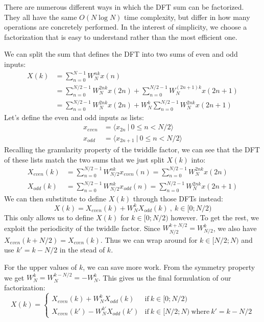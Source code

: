 There are numerous different ways in which the DFT sum can be factorized.
They all have the same $O(N \log N)$ time complexity,
but differ in how many operations are concretely performed.
In the interest of simplicity,
we choose a factorization that is easy to understand rather than the most efficient one.

We can split the sum that defines the DFT into two sums of even and odd inputs:
\begin{align}
    X(k) &= \sum_{n = 0}^{N - 1} W_N^{nk} x(n) \\
    &= \sum_{n = 0}^{N/2 - 1} W_N^{2nk} x(2n) + \sum_{n = 0}^{N/2 - 1} W_N^{(2n + 1)k} x(2n + 1) \\
    &= \sum_{n = 0}^{N/2 - 1} W_N^{2nk} x(2n) + W_N^k \sum_{n = 0}^{N/2 - 1} W_N^{2nk} x(2n + 1) %
\end{align}
Let's define the even and odd inputs as lists:
\begin{align}
    x_\textit{even} &= \langle x_{2n} ~|~ 0 \leq n < N/2 \rangle\\
    x_\textit{odd}  &= \langle x_{2n + 1} ~|~ 0 \leq n < N/2 \rangle
\end{align}
Recalling the granularity property of the twiddle factor,
we can see that the DFT of these lists match the two sums that we just split $X(k)$ into:
\begin{align}
    X_\textit{even}(k) &= \sum_{n = 0}^{N/2 - 1} W_{N/2}^{nk} x_\textit{even}(n) = \sum_{n = 0}^{N/2 - 1} W_{N}^{2nk} x(2n) \\
    X_\textit{odd}(k) &= \sum_{n = 0}^{N/2 - 1} W_{N/2}^{nk} x_\textit{odd}(n) = \sum_{n = 0}^{N/2 - 1} W_{N}^{2nk} x(2n + 1)
\end{align}
We can then substitute to define $X(k)$ through those DFTs instead:
\begin{equation}
    X(k) = X_\textit{even}(k) + W_N^k X_\textit{odd}(k) ~,~ k \in [0;N/2)
\end{equation}
This only allows us to define $X(k)$ for $k \in [0;N/2)$ however.
To get the rest, we exploit the periodicity of the twiddle factor.
Since $W_{N/2}^{k + N/2} = W_{N/2}^k$, we also have $X_\textit{even}(k + N/2) = X_\textit{even}(k)$.
Thus we can wrap around for $k \in [N/2;N)$ and use $k' = k - N/2$ in the stead of $k$.

For the upper values of $k$, we can save more work.
From the symmetry property we get $W_N^k = W_N^{k - N/2} = -W_N^{k}$.
This gives us the final formulation of our factorization:
\begin{equation}
    X(k) =
    \begin{cases}
        X_\textit{even}(k) + W_N^k X_\textit{odd}(k) &\text{if}~k \in [0;N/2) \\
        X_\textit{even}(k') - W_N^{k'} X_\textit{odd}(k') &\text{if}~k \in [N/2;N) ~\text{where}~k' = k - N/2
    \end{cases}
\end{equation}

